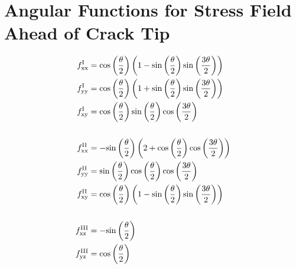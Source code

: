\documentclass[format=acmtog, 12pt, screen=true, review=false]{acmart}
\begin{document}
\section{Angular Functions for Stress Field Ahead of Crack Tip}\label{app:AngularFunctions}

\begin{align*}
    f_{\rm{xx}}^{\rm{I}}&=\rm{cos}\left(\frac{\theta}{2}\right)\left(1-\rm{sin}\left(\frac{\theta}{2}\right)\rm{sin}\left(\frac{3\theta}{2}\right)\right)\\
    f_{\rm{yy}}^{\rm{I}}&=\rm{cos}\left(\frac{\theta}{2}\right)\left(1+\rm{sin}\left(\frac{\theta}{2}\right)\rm{sin}\left(\frac{3\theta}{2}\right)\right)\\
    f_{\rm{xy}}^{\rm{I}}&=\rm{cos}\left(\frac{\theta}{2}\right)\rm{sin}\left(\frac{\theta}{2}\right)\rm{cos}\left(\frac{3\theta}{2}\right)\\
    \\
    f_{\rm{xx}}^{\rm{II}}&=-\rm{sin}\left(\frac{\theta}{2}\right)\left(2+\rm{cos}\left(\frac{\theta}{2}\right)\rm{cos}\left(\frac{3\theta}{2}\right)\right)\\
    f_{\rm{yy}}^{\rm{II}}&=\rm{sin}\left(\frac{\theta}{2}\right)\rm{cos}\left(\frac{\theta}{2}\right)\rm{cos}\left(\frac{3\theta}{2}\right)\\
    f_{\rm{xy}}^{\rm{II}}&=\rm{cos}\left(\frac{\theta}{2}\right)\left(1-\rm{sin}\left(\frac{\theta}{2}\right)\rm{sin}\left(\frac{3\theta}{2}\right)\right)\\
    \\
    f_{\rm{xz}}^{\rm{III}}&=-\rm{sin}\left(\frac{\theta}{2}\right)\\
    f_{\rm{yz}}^{\rm{III}}&=\rm{cos}\left(\frac{\theta}{2}\right)\\
\end{align*}
\end{document}
